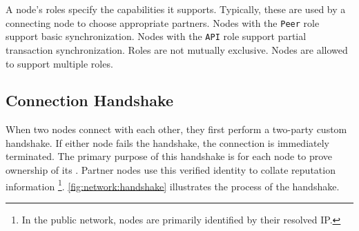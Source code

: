 A node's roles specify the capabilities it supports.
Typically, these are used by a connecting node to choose appropriate partners.
Nodes with the \texttt{Peer} role support basic synchronization.
Nodes with the \texttt{API} role support partial transaction synchronization.
Roles are not mutually exclusive.
Nodes are allowed to support multiple roles.

\subsection{Connection Handshake}

When two \codenamespace nodes connect with each other, they first perform a two-party custom handshake.
If either node fails the handshake, the connection is immediately terminated.
The primary purpose of this handshake is for each node to prove ownership of its .
Partner nodes use this verified identity to collate reputation  information
\footnote{In the public network, nodes are primarily identified by their resolved IP.}.
\autoref{fig:network:handshake} illustrates the process of the handshake.

